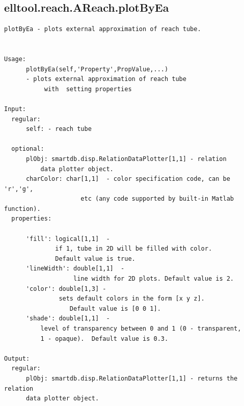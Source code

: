 \documentclass[letterpaper,10pt,english]{sphinxmanual}
\begin{document}
\subsection{elltool.reach.AReach.plotByEa}
\label{chap_functions:elltool-reach-areach-plotbyea}
\begin{Verbatim}[commandchars=\\\{\}]
plotByEa - plots external approximation of reach tube.


Usage:
      plotByEa(self,'Property',PropValue,...)
      - plots external approximation of reach tube
           with  setting properties

Input:
  regular:
      self: - reach tube

  optional:
      plObj: smartdb.disp.RelationDataPlotter[1,1] - relation
          data plotter object.
      charColor: char[1,1]  - color specification code, can be 'r','g',
                     etc (any code supported by built-in Matlab function).
  properties:

      'fill': logical[1,1]  -
              if 1, tube in 2D will be filled with color.
              Default value is true.
      'lineWidth': double[1,1]  -
                   line width for 2D plots. Default value is 2.
      'color': double[1,3] -
               sets default colors in the form [x y z].
                  Default value is [0 0 1].
      'shade': double[1,1]  -
          level of transparency between 0 and 1 (0 - transparent,
          1 - opaque).  Default value is 0.3.

Output:
  regular:
      plObj: smartdb.disp.RelationDataPlotter[1,1] - returns the relation
      data plotter object.
\end{Verbatim}
\end{document}
